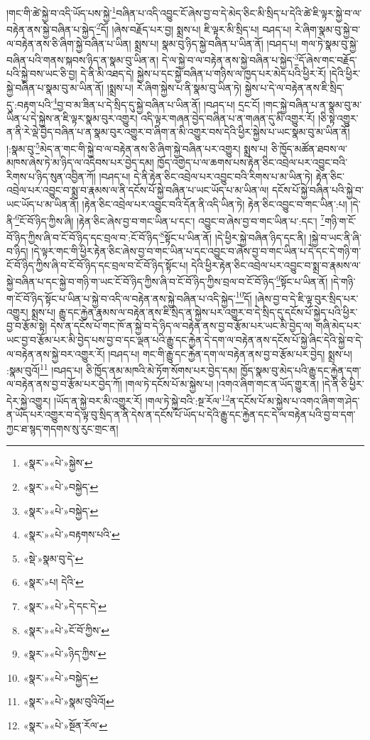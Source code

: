 །གང་གི་ཚེ་སྐྱེ་བ་འདི་ཡོད་པས་སྐྱེ་\footnote{«སྣར་»«པེ་»སྐྱེས་}བཞིན་པ་འདི་འབྱུང་ངོ་ཞེས་བྱ་བ་དེ་མེད་ཅིང་མི་སྲིད་པ་དེའི་ཚེ་ཇི་ལྟར་སྐྱེ་བ་ལ་བརྟེན་ནས་སྐྱེ་བཞིན་པ་སྐྱེད་\footnote{«སྣར་»«པེ་»བསྐྱེད་}དོ། །ཞེས་བརྗོད་པར་བྱ། སྨྲས་པ། ཇི་ལྟར་མི་སྲིད་པ། བཤད་པ། རེ་ཞིག་སྣམ་བུ་སྐྱེ་བ་ལ་བརྟེན་ནས་ཅི་ཞིག་སྐྱེ་བཞིན་པ་ཡིན། སྨྲས་པ། སྣམ་བུ་ཉིད་སྐྱེ་བཞིན་པ་ཡིན་ནོ། །བཤད་པ། གལ་ཏེ་སྣམ་བུ་སྐྱེ་བཞིན་པའི་གནས་སྐབས་ཉིད་ན་སྣམ་བུ་ཡིན་ན། དེ་ལ་སྐྱེ་བ་ལ་བརྟེན་ནས་སྐྱེ་བཞིན་པ་སྐྱེད་\footnote{«སྣར་»«པེ་»བསྐྱེད་}དོ་ཞེས་གང་བརྗོད་པའི་སྐྱེ་བས་ཡང་ཅི་བྱ། དེ་ནི་མི་འཐད་དེ། སྐྱེས་པ་དང་སྐྱེ་བཞིན་པ་གཉིས་ལ་ཁྱད་པར་མེད་པའི་ཕྱིར་རོ། །དེའི་ཕྱིར་སྐྱེ་བཞིན་པ་སྣམ་བུ་མ་ཡིན་ནོ། །སྨྲས་པ། རེ་ཞིག་སྐྱེས་པ་ནི་སྣམ་བུ་ཡིན་ཏེ། སྐྱེས་པ་དེ་ལ་བརྟེན་ནས་ཇི་སྲིད་དུ་:བརྟག་པའི་\footnote{«སྣར་»«པེ་»བརྟགས་པའི་}བྱ་བ་མ་ཟིན་པ་དེ་སྲིད་དུ་སྐྱེ་བཞིན་པ་ཡིན་ནོ། །བཤད་པ། དྲང་ངོ། །གང་སྐྱེ་བཞིན་པ་ན་སྣམ་བུ་མ་ཡིན་པ་དེ་སྐྱེས་ན་ཇི་ལྟར་སྣམ་བུར་འགྱུར། འདི་ལྟར་གཞན་བྱེད་བཞིན་པ་ན་གཞན་དུ་མི་འགྱུར་རོ། །ཅི་སྟེ་འགྱུར་ན་ནི་རེ་ལྡེ་བྱེད་བཞིན་པ་ན་སྣམ་བུར་འགྱུར་བ་ཞིག་ན་མི་འགྱུར་བས་དེའི་ཕྱིར་སྐྱེས་པ་ཡང་སྣམ་བུ་མ་ཡིན་ནོ། །:སྣམ་བུ་\footnote{«སྡེ་»སྣམ་བུ་དེ་}མེད་ན་གང་གི་སྐྱེ་བ་ལ་བརྟེན་ནས་ཅི་ཞིག་སྐྱེ་བཞིན་པར་འགྱུར། སྨྲས་པ། ཅི་ཁྱོད་མཚོན་ཐབས་ལ་མཁས་ཞེས་ཏེ་མ་ཉིད་ལ་འདེབས་པར་བྱེད་དམ། ཁྱོད་འགྱེད་པ་ལ་ཆགས་པས་རྟེན་ཅིང་འབྲེལ་པར་འབྱུང་བའི་རིགས་པ་ཉིད་སུན་འབྱིན་ཀོ། །བཤད་པ། དེ་ནི་རྟེན་ཅིང་འབྲེལ་པར་འབྱུང་བའི་རིགས་པ་མ་ཡིན་ཏེ། རྟེན་ཅིང་འབྲེལ་པར་འབྱུང་བ་སྨྲ་བ་རྣམས་ལ་ནི་དངོས་པོ་སྐྱེ་བཞིན་པ་ཡང་ཡོད་པ་མ་ཡིན་ལ། དངོས་པོ་སྐྱེ་བཞིན་པའི་སྐྱེ་བ་ཡང་ཡོད་པ་མ་ཡིན་ནོ། །རྟེན་ཅིང་འབྲེལ་པར་འབྱུང་བའི་དོན་ནི་འདི་ཡིན་ཏེ། རྟེན་ཅིང་འབྱུང་བ་གང་ཡིན་:པ། །དེ་ནི་\footnote{«སྣར་»པ། དེའི་}ངོ་བོ་ཉིད་ཀྱིས་ཞི། །རྟེན་ཅིང་ཞེས་བྱ་བ་གང་ཡིན་པ་དང་། འབྱུང་བ་ཞེས་བྱ་བ་གང་ཡིན་པ་:དང་། \footnote{«སྣར་»«པེ་»དེ་དང་དེ་}གཉི་ག་ངོ་བོ་ཉིད་ཀྱིས་ཞི་བ་ངོ་བོ་ཉིད་དང་བྲལ་བ་:ངོ་བོ་ཉིད་\footnote{«སྣར་»«པེ་»ངོ་བོ་ཀྱིས་}སྟོང་པ་ཡིན་ནོ། །དེ་ཕྱིར་སྐྱེ་བཞིན་ཉིད་དང་ནི། །སྐྱེ་བ་ཡང་ནི་ཞི་བ་ཉིད། །དེ་ལྟར་གང་གི་ཕྱིར་རྟེན་ཅིང་ཞེས་བྱ་བ་གང་ཡིན་པ་དང་འབྱུང་བ་ཞེས་བྱ་བ་གང་ཡིན་པ་དེ་དང་དེ་གཉི་ག་ངོ་བོ་ཉིད་ཀྱིས་ཞི་བ་ངོ་བོ་ཉིད་དང་བྲལ་བ་ངོ་བོ་ཉིད་སྟོང་པ། དེའི་ཕྱིར་རྟེན་ཅིང་འབྲེལ་པར་འབྱུང་བ་སྨྲ་བ་རྣམས་ལ་སྐྱེ་བཞིན་པ་དང་སྐྱེ་བ་གཉི་ག་ཡང་ངོ་བོ་ཉིད་ཀྱིས་ཞི་བ་ངོ་བོ་ཉིད་ཀྱིས་བྲལ་བ་ངོ་བོ་ཉིད་\footnote{«སྣར་»«པེ་»ཉིད་ཀྱིས་}སྟོང་པ་ཡིན་ནོ། །དེ་གཉི་ག་ངོ་བོ་ཉིད་སྟོང་པ་ཡིན་པ་སྐྱེ་བ་འདི་ལ་བརྟེན་ནས་སྐྱེ་བཞིན་པ་འདི་སྐྱེད་\footnote{«སྣར་»«པེ་»བསྐྱེད་}དོ། །ཞེས་བྱ་བ་དེ་ཇི་ལྟ་བུར་སྲིད་པར་འགྱུར། སྨྲས་པ། རྒྱུ་དང་རྐྱེན་རྣམས་ལ་བརྟེན་ནས་ཇི་སྲིད་ན་སྐྱེས་པར་འགྱུར་བ་དེ་སྲིད་དུ་དངོས་པོ་སྐྱེད་པའི་ཕྱིར་བྱ་བ་རྩོམ་སྟེ། དེས་ན་དངོས་པོ་གང་ཁོ་ན་སྐྱེ་བ་དེ་ཉིད་ལ་བརྟེན་ནས་བྱ་བ་རྩོམ་པར་ཡང་མི་བྱེད་ལ། གཞི་མེད་པར་ཡང་བྱ་བ་རྩོམ་པར་མི་བྱེད་པས་བྱ་བ་དང་ལྡན་པའི་རྒྱུ་དང་རྐྱེན་དེ་དག་ལ་བརྟེན་ནས་དངོས་པོ་སྐྱེ་ཞིང་དེའི་སྐྱེ་བ་དེ་ལ་བརྟེན་ནས་སྐྱེ་བར་འགྱུར་རོ། །བཤད་པ། གང་གི་རྒྱུ་དང་རྐྱེན་དག་ལ་བརྟེན་ནས་བྱ་བ་རྩོམ་པར་བྱེད། སྨྲས་པ། :སྣམ་བུའོ།\footnote{«སྣར་»«པེ་»སྣམ་བུའིའོ།} །བཤད་པ། ཅི་ཁྱོད་ནམ་མཁའི་མེ་ཏོག་སོགས་པར་བྱེད་དམ། ཁྱོད་སྣམ་བུ་མེད་པའི་རྒྱུ་དང་རྐྱེན་དག་ལ་བརྟེན་ནས་བྱ་བ་རྩོམ་པར་བྱེད་ཀོ། །གལ་ཏེ་དངོས་པོ་མ་སྐྱེས་པ། །འགའ་ཞིག་གང་ན་ཡོད་གྱུར་ན། །དེ་ནི་ཅི་ཕྱིར་དེར་སྐྱེ་འགྱུར། །ཡོད་ན་སྐྱེ་བར་མི་འགྱུར་རོ། །གལ་ཏེ་སྐྱེ་བའི་:སྔ་རོལ་\footnote{«སྣར་»«པེ་»སྔོན་རོལ་}ན་དངོས་པོ་མ་སྐྱེས་པ་འགའ་ཞིག་ག་ཤེད་ན་ཡོད་པར་འགྱུར་བ་དེ་ལྟ་བུ་སྲིད་ན་ནི་དེས་ན་དངོས་པོ་ཡོད་པ་དེའི་རྒྱུ་དང་རྐྱེན་དང་དེ་ལ་བརྟེན་པའི་བྱ་བ་དག་ཀྱང་ཐ་སྙད་གདགས་སུ་རུང་གྲང་ན། 